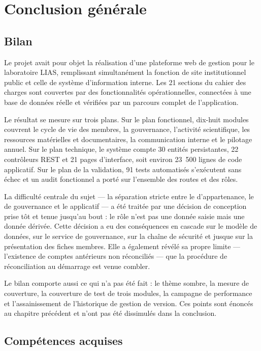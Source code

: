 \chapter{Conclusion générale}
\label{ch:conclusion}

\section{Bilan}

Le projet avait pour objet la réalisation d'une plateforme web de gestion pour le
laboratoire LIAS, remplissant simultanément la fonction de site institutionnel public et
celle de système d'information interne. Les 21 sections du cahier des charges sont
couvertes par des fonctionnalités opérationnelles, connectées à une base de données réelle
et vérifiées par un parcours complet de l'application.

Le résultat se mesure sur trois plans. Sur le plan fonctionnel, dix-huit modules couvrent
le cycle de vie des membres, la gouvernance, l'activité scientifique, les ressources
matérielles et documentaires, la communication interne et le pilotage annuel. Sur le plan
technique, le système compte 30 entités persistantes, 22 contrôleurs REST et 21 pages
d'interface, soit environ 23~500 lignes de code applicatif. Sur le plan de la validation,
91 tests automatisés s'exécutent sans échec et un audit fonctionnel a porté sur l'ensemble
des routes et des rôles.

La difficulté centrale du sujet --- la séparation stricte entre le \srt{} d'appartenance,
le \man{} de gouvernance et le \rol{} applicatif --- a été traitée par une décision de
conception prise tôt et tenue jusqu'au bout : le rôle n'est pas une donnée saisie mais une
donnée dérivée. Cette décision a eu des conséquences en cascade sur le modèle de données,
sur le service de gouvernance, sur la chaîne de sécurité et jusque sur la présentation des
fiches membres. Elle a également révélé sa propre limite --- l'existence de comptes
antérieurs non réconciliés --- que la procédure de réconciliation au démarrage est venue
combler.

Le bilan comporte aussi ce qui n'a pas été fait : le thème sombre, la mesure de couverture,
la couverture de test de trois modules, la campagne de performance et l'assainissement de
l'historique de gestion de version. Ces points sont énoncés au chapitre précédent et n'ont
pas été dissimulés dans la conclusion.

\section{Compétences acquises}

